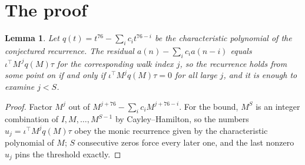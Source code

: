 \documentclass[11pt,a4paper]{article}
\theoremstyle{plain}
\newtheorem{lemma}[theorem]{Lemma}
\theoremstyle{definition}
\begin{document}
\section{The proof}

\begin{lemma}\label{lem:crit}
Let $q(t)=t^{76}-\sum_i c_it^{76-i}$ be the characteristic polynomial of the
conjectured recurrence. The residual $a(n)-\sum_ic_ia(n-i)$ equals
$\iota^{\!\top}M^{\,j}q(M)\tau$ for the corresponding walk index $j$, so the recurrence
holds from some point on if and only if $\iota^{\!\top}M^{j}q(M)\tau=0$ for all large $j$,
and it is enough to examine $j<S$.
\end{lemma}

\begin{proof}
Factor $M^{j}$ out of $M^{j+76}-\sum_ic_iM^{j+76-i}$. For the bound, $M^{S}$
is an integer combination of $I,M,\dots,M^{S-1}$ by Cayley--Hamilton, so the numbers
$u_j=\iota^{\!\top}M^{j}q(M)\tau$ obey the monic recurrence given by the characteristic
polynomial of $M$; $S$ consecutive zeros force every later one, and the last nonzero $u_j$
pins the threshold exactly.
\end{proof}
\end{document}
